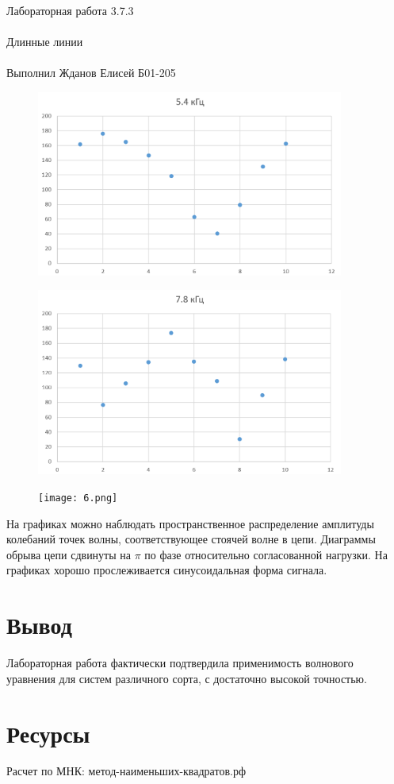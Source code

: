 \documentclass{astroedu-lab}
\begin{document}
\begin{problem}{\huge Лабораторная работа 3.7.3\\\\Длинные линии\\\\Выполнил Жданов Елисей Б01-205}
\begin{figure}[!h]
	\centering
	\includegraphics[width=0.9\textwidth]{4.png}
	\label{fig:boiler}
\end{figure}

\newpage

\begin{figure}[!h]
	\centering
	\includegraphics[width=0.9\textwidth]{5.png}
	\label{fig:boiler}
\end{figure}

\begin{figure}[!h]
	\centering
	\texttt{[image: 6.png]}
	\label{fig:boiler}
\end{figure}

\newpage

На графиках можно наблюдать пространственное распределение амплитуды колебаний точек волны, соответствующее стоячей волне в цепи. Диаграммы обрыва цепи сдвинуты на $\pi$ по фазе относительно согласованной нагрузки. На графиках хорошо прослеживается синусоидальная форма сигнала.

\section{Вывод}

Лабораторная работа фактически подтвердила применимость волнового уравнения для систем различного сорта, с достаточно высокой точностью.

\section{Ресурсы}

Расчет по МНК: метод-наименьших-квадратов.рф


\end{problem}
\end{document}
